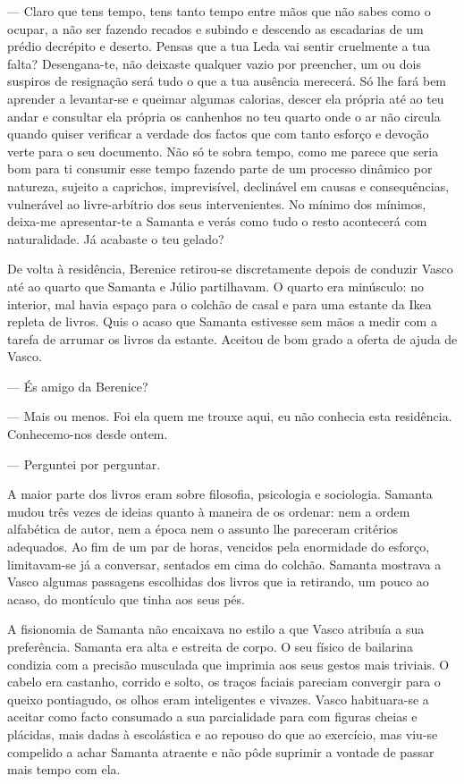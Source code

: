 --- Claro que tens tempo, tens tanto tempo entre mãos que não sabes como o
  ocupar, a não ser fazendo recados e subindo e descendo as escadarias
  de um prédio decrépito e deserto. Pensas que a tua Leda vai sentir
  cruelmente a tua falta? Desengana-te, não deixaste qualquer vazio por
  preencher, um ou dois suspiros de resignação será tudo o que a tua
  ausência merecerá. Só lhe fará bem aprender a levantar-se e queimar
  algumas calorias, descer ela própria até ao teu andar e consultar
  ela própria os canhenhos no teu quarto onde o ar não circula quando
  quiser verificar a verdade dos factos que com tanto esforço e devoção
  verte para o seu documento. Não só te sobra tempo, como me parece que
  seria bom para ti consumir esse tempo fazendo parte de um processo
  dinâmico por natureza, sujeito a caprichos, imprevisível, declinável
  em causas e consequências, vulnerável ao livre-arbítrio dos seus
  intervenientes. No mínimo dos mínimos, deixa-me apresentar-te a
  Samanta e verás como tudo o resto acontecerá com naturalidade. Já
  acabaste o teu gelado?

De volta à residência, Berenice retirou-se discretamente depois de
conduzir Vasco até ao quarto que Samanta e Júlio partilhavam. O quarto
era minúsculo: no interior, mal havia
espaço para o colchão de casal e para uma estante da Ikea repleta de
livros. Quis o acaso que Samanta estivesse sem mãos a medir com a tarefa
de arrumar os livros da estante. Aceitou de bom grado a oferta de ajuda
de Vasco.

--- És amigo da Berenice?

--- Mais ou menos. Foi ela quem me trouxe aqui, eu não conhecia esta
  residência. Conhecemo-nos desde ontem.

--- Perguntei por perguntar.

A maior parte dos livros eram sobre filosofia, psicologia e sociologia.
Samanta mudou três vezes de ideias quanto à maneira de os ordenar: nem
a ordem alfabética de autor, nem a época nem o assunto lhe pareceram
critérios adequados. Ao fim de um par de horas, vencidos pela enormidade
do esforço, limitavam-se já a conversar, sentados em cima do colchão.
Samanta mostrava a Vasco algumas passagens escolhidas dos livros que ia
retirando, um pouco ao acaso, do montículo que tinha aos seus pés.

A fisionomia de Samanta não encaixava no estilo a que Vasco atribuía a
sua preferência. Samanta era alta e estreita de corpo. O seu físico de
bailarina condizia com a precisão musculada que imprimia aos seus
gestos mais triviais. O cabelo era castanho, corrido e solto, os traços
faciais pareciam convergir para o queixo pontiagudo, os olhos eram
inteligentes e vivazes. Vasco habituara-se a aceitar como facto
consumado a sua parcialidade para com figuras cheias e plácidas, mais
dadas à escolástica e ao repouso do que ao exercício, mas viu-se compelido a achar Samanta atraente e não pôde suprimir a vontade de
passar mais tempo com ela.

